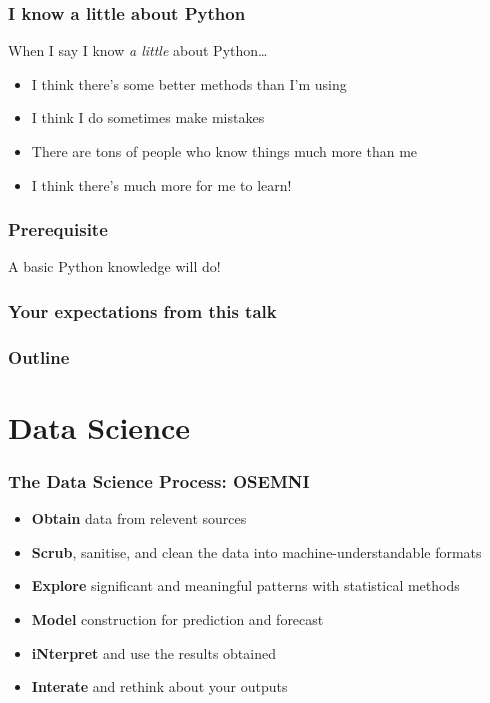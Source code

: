 \documentclass[aspectratio=169]{beamer}
\begin{document}
\begin{frame}
    \frametitle{I know a little about Python}
    When I say I know \textit{a little} about Python\dots
    \begin{itemize}
        \item I think there's some better methods than I'm using
        \item I think I do sometimes make mistakes
        \item There are tons of people who know things much more than me
        \item I think there's much more for me to learn!
    \end{itemize}
\end{frame}

\begin{frame}
    \frametitle{Prerequisite}
    A basic Python knowledge will do!
\end{frame}

\begin{frame}
    \frametitle{Your expectations from this talk}
\end{frame}

\begin{frame}
	\frametitle{Outline}
    \tableofcontents
\end{frame}

\section{Data Science}

\begin{frame}
    \frametitle{The Data Science Process: OSEMNI}
    \begin{itemize}
        \item \textbf{Obtain} data from relevent sources
        \item \textbf{Scrub}, sanitise, and clean the data into machine-understandable formats
        \item \textbf{Explore} significant and meaningful patterns with statistical methods
        \item \textbf{Model} construction for prediction and forecast
        \item \textbf{iNterpret} and use the results obtained
        \item \textbf{Interate} and rethink about your outputs
    \end{itemize}
\end{frame}
\end{document}
